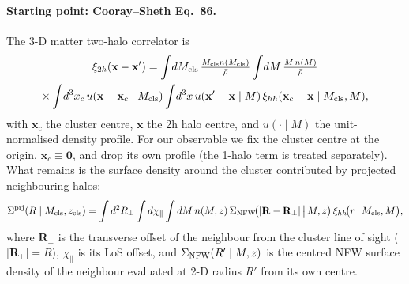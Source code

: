 \documentclass[a4paper, 11pt]{article}
\newcommand{\zcls}{z_{\rm cls}}
\newcommand{\Mcls}{M_{\rm cls}}
\newcommand{\xihh}{\xi_{hh}}
\newcommand{\Sprj}{\Sigma^{\rm prj}}
\newcommand{\chipar}{\chi_\parallel}
\begin{document}
\paragraph{Starting point: Cooray--Sheth Eq.~86.}
The 3-D matter two-halo correlator is
\citep[Eq.~86]{CoorayShethHaloModel}
\begin{multline}
\xi_{2h}(\mathbf{x}-\mathbf{x}')
= \int\!d\Mcls\,\tfrac{\Mcls n(\Mcls)}{\bar\rho}
  \int\!dM\,\tfrac{M\,n(M)}{\bar\rho} \\
  \times \int\!d^3x_c\,u(\mathbf{x}-\mathbf{x}_c\mid\Mcls)
  \int\!d^3x\,u(\mathbf{x}'-\mathbf{x}\mid M)\,
  \xihh(\mathbf{x}_c-\mathbf{x}\mid\Mcls,M),
\label{eq:CS86}
\end{multline}
with \(\mathbf{x}_c\) the cluster centre, \(\mathbf{x}\) the 2h
halo centre, and \(u(\cdot\mid M)\) the unit-normalised density
profile. For our observable we fix the cluster centre at the
origin, \(\mathbf{x}_c\equiv\mathbf{0}\), and drop its own profile
(the 1-halo term is treated separately). What remains is the
surface density around the cluster contributed by projected
neighbouring halos:
\begin{equation}
\Sprj(R\mid\Mcls,\zcls)
= \int d^2R_\perp \int d\chipar \int dM\,n(M,z)\,
  \Sigma_{\rm NFW}\!\bigl(|\mathbf{R}-\mathbf{R}_\perp|\,\big|\,M,z\bigr)\,
  \xihh\!\bigl(r\,\big|\,\Mcls,M\bigr),
\label{eq:cyl_raw}
\end{equation}
where \(\mathbf{R}_\perp\) is the transverse offset of the
neighbour from the cluster line of sight (\(|\mathbf{R}_\perp|=R\)),
\(\chipar\) is its LoS offset, and
\(\Sigma_{\rm NFW}(R'\mid M,z)\) is the centred NFW surface
density of the neighbour evaluated at 2-D radius \(R'\) from its
own centre.
\end{document}
